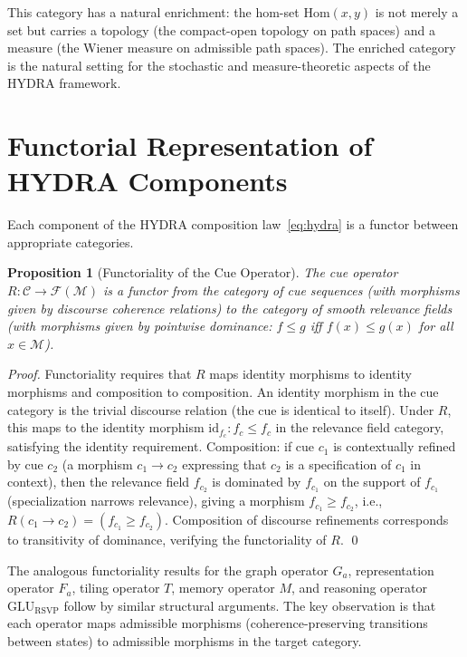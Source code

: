 \documentclass[12pt, a4paper, openany]{book}
\theoremstyle{plain}
\newtheorem{proposition}[theorem]{Proposition}
\theoremstyle{definition}
\theoremstyle{remark}
\begin{document}
This category has a natural enrichment: the hom-set $\mathrm{Hom}(x, y)$ is not merely a set but carries a topology (the compact-open topology on path spaces) and a measure (the Wiener measure on admissible path spaces). The enriched category is the natural setting for the stochastic and measure-theoretic aspects of the HYDRA framework.

\section{Functorial Representation of HYDRA Components}

Each component of the HYDRA composition law~\eqref{eq:hydra} is a functor between appropriate categories.

\begin{proposition}[Functoriality of the Cue Operator]
The cue operator $R: \mathcal{C} \to \mathcal{F}(\mathcal{M})$ is a functor from the category of cue sequences (with morphisms given by discourse coherence relations) to the category of smooth relevance fields (with morphisms given by pointwise dominance: $f \leq g$ iff $f(x) \leq g(x)$ for all $x \in \mathcal{M}$).
\end{proposition}

\begin{proof}
Functoriality requires that $R$ maps identity morphisms to identity morphisms and composition to composition. An identity morphism in the cue category is the trivial discourse relation (the cue is identical to itself). Under $R$, this maps to the identity morphism $\mathrm{id}_{f_c}: f_c \leq f_c$ in the relevance field category, satisfying the identity requirement. Composition: if cue $c_1$ is contextually refined by cue $c_2$ (a morphism $c_1 \to c_2$ expressing that $c_2$ is a specification of $c_1$ in context), then the relevance field $f_{c_2}$ is dominated by $f_{c_1}$ on the support of $f_{c_1}$ (specialization narrows relevance), giving a morphism $f_{c_1} \geq f_{c_2}$, i.e., $R(c_1 \to c_2) = (f_{c_1} \geq f_{c_2})$. Composition of discourse refinements corresponds to transitivity of dominance, verifying the functoriality of $R$. \qed
\end{proof}

The analogous functoriality results for the graph operator $G_a$, representation operator $F_a$, tiling operator $T$, memory operator $M$, and reasoning operator $\mathrm{GLU}_\mathrm{RSVP}$ follow by similar structural arguments. The key observation is that each operator maps admissible morphisms (coherence-preserving transitions between states) to admissible morphisms in the target category.
\end{document}
